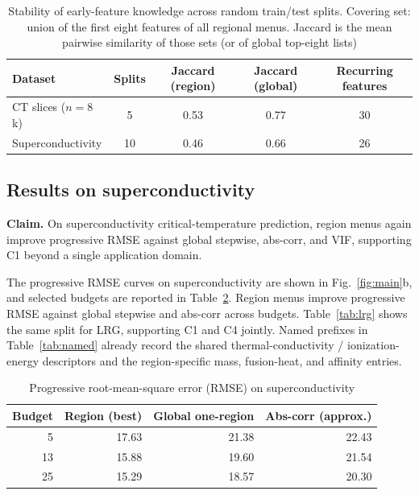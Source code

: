 \documentclass[pdflatex,sn-basic,Numbered]{sn-jnl}
\begin{document}
\begin{table}[t]
\centering
\caption{Stability of early-feature knowledge across random train/test splits. Covering set: union of the first eight features of all regional menus. Jaccard is the mean pairwise similarity of those sets (or of global top-eight lists)}
\label{tab:stability}
\small
\begin{tabular}{@{}lcccc@{}}
\toprule
Dataset & Splits & Jaccard (region) & Jaccard (global) & Recurring features \\
\midrule
CT slices (\(n=8\)k) & 5 & 0.53 & 0.77 & 30 \\
Superconductivity & 10 & 0.46 & 0.66 & 26 \\
\bottomrule
\end{tabular}
\end{table}

\subsection{Results on superconductivity}
\label{sec:sc}

\textbf{Claim.} On superconductivity critical-temperature prediction, region menus again improve progressive RMSE against global stepwise, abs-corr, and VIF, supporting C1 beyond a single application domain.

The progressive RMSE curves on superconductivity are shown in Fig.~\ref{fig:main}b, and selected budgets are reported in Table~\ref{tab:sc}. Region menus improve progressive RMSE against global stepwise and abs-corr across budgets. Table~\ref{tab:lrg} shows the same split for LRG, supporting C1 and C4 jointly. Named prefixes in Table~\ref{tab:named} already record the shared thermal-conductivity / ionization-energy descriptors and the region-specific mass, fusion-heat, and affinity entries.

\begin{table}[t]
\centering
\caption{Progressive root-mean-square error (RMSE) on superconductivity}
\label{tab:sc}
\begin{tabular}{@{}rrrr@{}}
\toprule
Budget & Region (best) & Global one-region & Abs-corr (approx.) \\
\midrule
5 & 17.63 & 21.38 & 22.43 \\
13 & 15.88 & 19.60 & 21.54 \\
25 & 15.29 & 18.57 & 20.30 \\
\bottomrule
\end{tabular}
\end{table}
\end{document}

